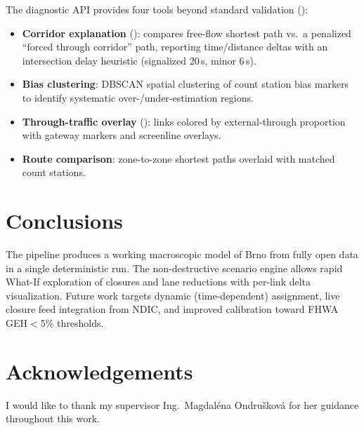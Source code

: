 \documentclass{ExcelAtFIT}
\begin{document}
The diagnostic API provides four tools beyond standard validation ():
\begin{itemize}
  \item \textbf{Corridor explanation} (): compares free-flow shortest path vs.\ a penalized ``forced through corridor'' path, reporting time/distance deltas with an intersection delay heuristic (signalized 20\,s, minor 6\,s).
  \item \textbf{Bias clustering}: DBSCAN spatial clustering of count station bias markers to identify systematic over-/under-estimation regions.
  \item \textbf{Through-traffic overlay} (): links colored by external-through proportion with gateway markers and screenline overlays.
  \item \textbf{Route comparison}: zone-to-zone shortest paths overlaid with matched count stations.
\end{itemize}


\section{Conclusions}

The pipeline produces a working macroscopic model of Brno from fully open data in a single deterministic run.
The non-destructive scenario engine allows rapid What-If exploration of closures and lane reductions with per-link delta visualization.
Future work targets dynamic (time-dependent) assignment, live closure feed integration from NDIC, and improved calibration toward FHWA GEH$<$5\% thresholds.


\section*{Acknowledgements}
I would like to thank my supervisor Ing.\ Magdaléna Ondrušková for her guidance throughout this work.



\end{document}
